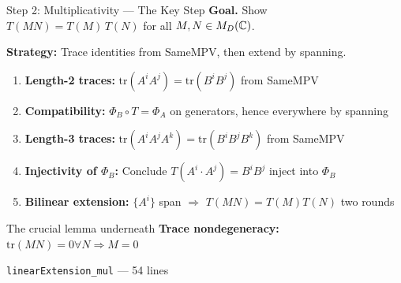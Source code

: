 \documentclass[aspectratio=169,10pt]{beamer}
\begin{document}
\begin{frame}{Step 2: Multiplicativity --- The Key Step}
\textbf{Goal.} Show $T(MN) = T(M)\,T(N)$ for all $M,N\in M_D(\mathbb{C})$.

\vspace{0.4em}
\textbf{Strategy:} Trace identities from SameMPV, then extend by spanning.
\begin{enumerate}
  \item \textbf{Length-2 traces:}  $\mathrm{tr}(A^i A^j) = \mathrm{tr}(B^i B^j)$ \hfill {\small from SameMPV}
  \item \textbf{Compatibility:}  $\Phi_B \circ T = \Phi_A$ on generators, hence everywhere \hfill {\small by spanning}
  \item \textbf{Length-3 traces:}  $\mathrm{tr}(A^i A^j A^k) = \mathrm{tr}(B^i B^j B^k)$ \hfill {\small from SameMPV}
  \item \textbf{Injectivity of $\Phi_B$:}  Conclude $T(A^i \cdot A^j) = B^i B^j$ \hfill {\small inject into $\Phi_B$}
  \item \textbf{Bilinear extension:}  $\{A^i\}$ span $\Rightarrow$ $T(MN)=T(M)T(N)$ \hfill {\small two rounds}
\end{enumerate}

\vspace{0.4em}
\begin{block}{The crucial lemma underneath}
\textbf{Trace nondegeneracy:}  $\mathrm{tr}(MN)=0 \forall N \Longrightarrow  M=0$
\end{block}

\vspace{0.3em}
\textcolor{leangreen}{\checkmark}  \texttt{linearExtension\_mul} --- 54 lines
\end{frame}
\end{document}
